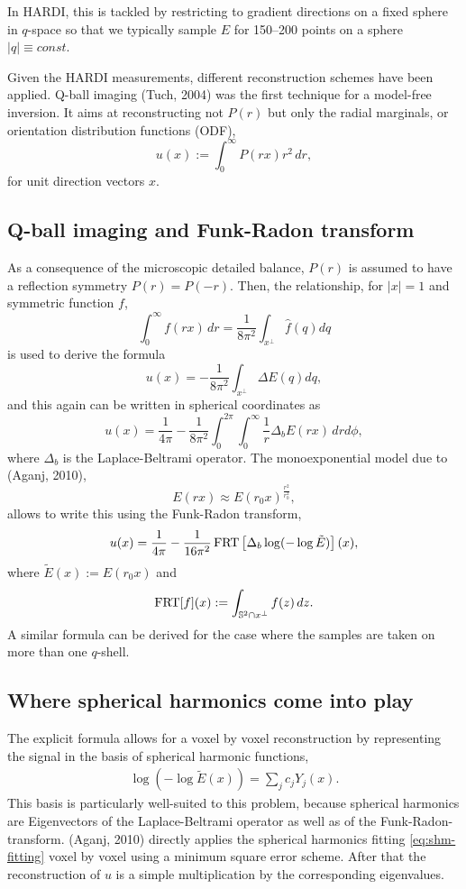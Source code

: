 In HARDI, this is tackled by restricting to gradient directions on a
fixed sphere in $q$-space so that we typically sample $E$ for 150--200 points
on a sphere $|q| \equiv const$.

Given the HARDI measurements, different reconstruction schemes have been
applied.
Q-ball imaging (Tuch, 2004) was the first technique for a model-free inversion.
It aims at reconstructing not $P(r)$ but only the radial marginals, or
orientation distribution functions (ODF),
\[
    u(x) := \int_0^\infty P(rx) r^2 \,dr,
\]
for unit direction vectors $x$.

\subsection{Q-ball imaging and Funk-Radon transform}

As a consequence of the microscopic detailed balance, $P(r)$ is assumed to have
a reflection symmetry $P(r) = P(-r)$.
Then, the relationship, for $|x| = 1$ and symmetric function $f$, 
\[
    \int_0^\infty f(rx) \,dr = \frac{1}{8\pi^2} \int_{x^\perp} \hat f (q) dq
\]
is used to derive the formula
\[
    u(x) = -\frac{1}{8\pi^2} \int_{x^\perp} \Delta E(q) dq,
\]
and this again can be written in spherical coordinates as
\[
    u(x) = \frac{1}{4\pi} - \frac{1}{8\pi^2} \int_0^{2\pi}\int_0^\infty
        \frac{1}{r} \Delta_b E(rx)
    \,drd\phi,
\]
where $\Delta_b$ is the Laplace-Beltrami operator.
The monoexponential model due to (Aganj, 2010),
\[
    E(rx) \approx E(r_0 x)^{\frac{r^2}{r_0^2}},
\]
allows to write this using the Funk-Radon transform,
\[
    u(x) = \frac{1}{4\pi} - \frac{1}{16\pi^2} \operatorname{FRT}\left[
        \Delta_b \log(-\log\tilde E)
    \right](x),
\]
where $\tilde E(x) := E(r_0 x)$ and
\[
    \operatorname{FRT}[f](x) := \int_{\mathbb{S}^2 \cap x^\perp} f(z) \,dz.
\]
A similar formula can be derived for the case where the samples are taken on
more than one $q$-shell.

\subsection{Where spherical harmonics come into play}

The explicit formula allows for a voxel by voxel reconstruction by representing
the signal in the basis of spherical harmonic functions,
\begin{align}\label{eq:shm-fitting}
    \log(-\log\tilde E(x)) = \sum_j c_j Y_j(x).
\end{align}
This basis is particularly well-suited to this problem, because spherical
harmonics are Eigenvectors of the Laplace-Beltrami operator as well as of the
Funk-Radon-transform.
(Aganj, 2010) directly applies the spherical harmonics fitting
\eqref{eq:shm-fitting} voxel by voxel using a minimum square error scheme.
After that the reconstruction of $u$ is a simple multiplication by the
corresponding eigenvalues.


